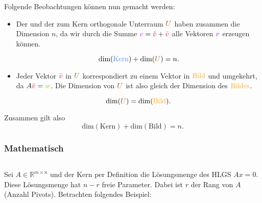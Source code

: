 Folgende Beobachtungen können nun gemacht werden:

\begin{itemize}
    \item Der \textcolor{customblue}{} und der zum Kern orthogonale Unterraum \( \textcolor{custombrown}{U} \) haben zusammen die Dimension \( n \), da wir durch die Summe \( \textcolor{customlila}{v} = \textcolor{customred}{\hat{v}} + \textcolor{customred}{\bar{v}} \) alle Vektoren \( \textcolor{customlila}{v} \) erzeugen können.
    
    \begin{equation*}
        \text{dim}(\textcolor{customblue}{\text{Kern}}) + \text{dim}(\textcolor{custombrown}{U}) = n.
    \end{equation*}

    \item Jeder Vektor \( \textcolor{customred}{\bar{v}} \) in \( \textcolor{custombrown}{U} \) korrespondiert zu einem Vektor in \( \textcolor{customorange}{\text{Bild}} \) und umgekehrt, da \( A \textcolor{customred}{\bar{v}} = \textcolor{customgreen}{w} \). Die Dimension von \( \textcolor{custombrown}{U} \) ist also gleich der Dimension des \( \textcolor{customorange}{\text{Bildes}} \).
    
    \begin{equation*}
        \text{dim}(\textcolor{custombrown}{U}) = \text{dim}(\textcolor{customorange}{\text{Bild}}).
    \end{equation*}
\end{itemize}

Zusammen gilt also 
\begin{equation*}
    \text{dim}(\text{Kern}) + \text{dim}(\text{Bild}) = n.    
\end{equation*}

\subsubsection*{Mathematisch} \( \quad \)

Sei \( A \in \mathbb{R}^{m \times n} \) und der Kern per Definition die Lösungsmenge des HLGS \( Ax = 0 \). Diese Lösungsmenge hat \( n-r \) freie Parameter. Dabei ist \( r \) der Rang von \( A \) (Anzahl Pivots). Betrachten folgendes Beispiel:

